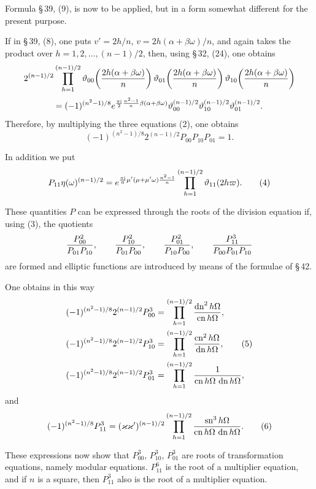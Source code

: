 \documentclass[11pt]{article}
\providecommand{\ii}{\mathrm{i}}
\providecommand{\sn}{\operatorname{sn}}
\providecommand{\cn}{\operatorname{cn}}
\providecommand{\dn}{\operatorname{dn}}
\begin{document}
Formula \S\,39, (9), is now to be applied, but in a form somewhat different for the present purpose.

If in \S\,39, (8), one puts $v'=2h/n$, $v=2h(\alpha+\beta\omega)/n$, and again takes the product over $h=1,2,\ldots,(n-1)/2$, then, using \S\,32, (24), one obtains
\[
2^{(n-1)/2}\prod_{h=1}^{(n-1)/2}
\vartheta_{00}\!\left({2h(\alpha+\beta\omega)\over n}\right)
\vartheta_{01}\!\left({2h(\alpha+\beta\omega)\over n}\right)
\vartheta_{10}\!\left({2h(\alpha+\beta\omega)\over n}\right)
\]
\[
=(-1)^{(n^2-1)/8}e^{{\pi\ii\over2}{n^2-1\over n}\beta(\alpha+\beta\omega)}
\vartheta_{00}^{(n-1)/2}\vartheta_{10}^{(n-1)/2}\vartheta_{01}^{(n-1)/2}.
\]
Therefore, by multiplying the three equations (2), one obtains
\begin{equation}
(-1)^{(n^2-1)/8}2^{(n-1)/2}P_{00}P_{10}P_{01}=1.
\tag{3}
\end{equation}

In addition we put
\begin{equation}
P_{11}\eta(\omega)^{(n-1)/2}=e^{{\pi\ii\over6}\mu'(\mu+\mu'\omega){n^2-1\over n}}
\prod_{h=1}^{(n-1)/2}\vartheta_{11}(2h\varpi).
\tag{4}
\end{equation}

These quantities $P$ can be expressed through the roots of the division equation if, using (3), the quotients
\[
{P_{00}^2\over P_{01}P_{10}},\qquad
{P_{10}^2\over P_{01}P_{00}},\qquad
{P_{01}^2\over P_{10}P_{00}},\qquad
{P_{11}^3\over P_{00}P_{01}P_{10}}
\]
are formed and elliptic functions are introduced by means of the formulae of \S\,42.

One obtains in this way
\begin{align}
(-1)^{(n^2-1)/8}2^{(n-1)/2}P_{00}^{3}
&=\prod_{h=1}^{(n-1)/2}{\dn^2 h\Omega\over \cn h\Omega},\notag\\
(-1)^{(n^2-1)/8}2^{(n-1)/2}P_{10}^{3}
&=\prod_{h=1}^{(n-1)/2}{\cn^2 h\Omega\over \dn h\Omega},\tag{5}\\
(-1)^{(n^2-1)/8}2^{(n-1)/2}P_{01}^{3}
&=\prod_{h=1}^{(n-1)/2}{1\over \cn h\Omega\,\dn h\Omega},\notag
\end{align}
and
\begin{equation}
(-1)^{(n^2-1)/8}P_{11}^{3}=(\varkappa\varkappa')^{(n-1)/2}
\prod_{h=1}^{(n-1)/2}{\sn^{3}h\Omega\over \cn h\Omega\,\dn h\Omega}.
\tag{6}
\end{equation}

These expressions now show that $P_{00}^{3}$, $P_{10}^{3}$, $P_{01}^{3}$ are roots of transformation equations, namely modular equations. $P_{11}^{6}$ is the root of a multiplier equation, and if $n$ is a square, then $P_{11}^{3}$ also is the root of a multiplier equation.
\end{document}
